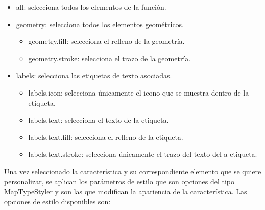 \begin{itemize}

\item all: selecciona todos los elementos de la función.

\item geometry: selecciona todos los elementos geométricos.

\begin{itemize}

\item geometry.fill: selecciona el relleno de la geometría.

\item geometry.stroke: selecciona el trazo de la geometría.


\end{itemize}

\item labels: selecciona las etiquetas de texto asociadas.

\begin{itemize}

\item labels.icon: selecciona únicamente el icono que se muestra dentro de la etiqueta.

\item labels.text: selecciona el texto de la etiqueta.

\item labels.text.fill: selecciona el relleno de la etiqueta.

\item labels.text.stroke: selecciona únicamente el trazo del texto del a etiqueta.

\end{itemize}

\end{itemize}

\vspace{5 mm}

Una vez seleccionado la característica y su correspondiente elemento que se quiere personalizar, se aplican los parámetros de estilo que son opciones del tipo MapTypeStyler y son las que modifican la apariencia de la característica. Las opciones de estilo disponibles son:

